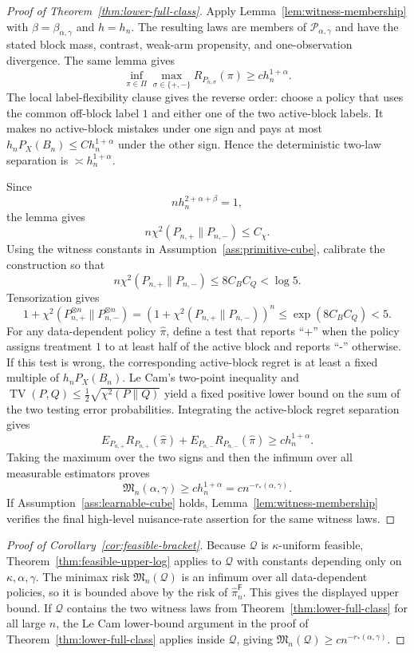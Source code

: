 \documentclass[11pt]{article}
\theoremstyle{definition}
\theoremstyle{plain}
\theoremstyle{remark}
\begin{document}
\begin{proof}[Proof of Theorem~\ref{thm:lower-full-class}]
Apply Lemma~\ref{lem:witness-membership} with
\(\beta=\beta_{\alpha,\gamma}\) and \(h=h_n\).  The resulting laws are
members of \(\mathcal P_{\alpha,\gamma}\) and have the stated block mass,
contrast, weak-arm propensity, and one-observation divergence.  The same
lemma gives
\[
\inf_{\pi\in\Pi}\max_{\sigma\in\{+,-\}}R_{P_{n,\sigma}}(\pi)
\ge c h_n^{1+\alpha}.
\]
The local label-flexibility clause gives the reverse order: choose a policy
that uses the common off-block label \(1\) and either one of the two
active-block labels.  It makes no active-block mistakes under one sign and
pays at most \(h_nP_X(B_n)\le C h_n^{1+\alpha}\) under the other sign.  Hence
the deterministic two-law separation is \(\asymp h_n^{1+\alpha}\).

Since
\[
n h_n^{2+\alpha+\beta}=1,
\]
the lemma gives
\[
n\chi^2(P_{n,+}\|P_{n,-})\le C_\chi.
\]
Using the witness constants in Assumption~\ref{ass:primitive-cube}, calibrate
the construction so that
\[
n\chi^2(P_{n,+}\|P_{n,-})\le 8C_BC_Q<\log 5.
\]
Tensorization gives
\[
1+\chi^2(P_{n,+}^{\otimes n}\|P_{n,-}^{\otimes n})
=(1+\chi^2(P_{n,+}\|P_{n,-}))^n
\le \exp(8C_BC_Q)<5.
\]
For any data-dependent policy \(\widehat\pi\), define a test that reports
``+'' when the policy assigns treatment \(1\) to at least half of the active
block and reports ``-'' otherwise.  If this test is wrong, the corresponding
active-block regret is at least a fixed multiple of \(h_nP_X(B_n)\).  Le
Cam's two-point inequality and
\(\operatorname{TV}(P,Q)\le\tfrac12\sqrt{\chi^2(P\|Q)}\) yield a fixed
positive lower bound on the sum of the two testing error probabilities.
Integrating the active-block regret separation gives
\[
E_{P_{n,+}}R_{P_{n,+}}(\widehat\pi)
+E_{P_{n,-}}R_{P_{n,-}}(\widehat\pi)
\ge c h_n^{1+\alpha}.
\]
Taking the maximum over the two signs and then the infimum over all
measurable estimators proves
\[
\mathfrak M_n(\alpha,\gamma)\ge c h_n^{1+\alpha}
=c n^{-r_*(\alpha,\gamma)}.
\]
If Assumption~\ref{ass:learnable-cube} holds,
Lemma~\ref{lem:witness-membership} verifies the final high-level
nuisance-rate assertion for the same witness laws.
\end{proof}

\begin{proof}[Proof of Corollary~\ref{cor:feasible-bracket}]
Because \(\mathcal Q\) is \(\kappa\)-uniform feasible,
Theorem~\ref{thm:feasible-upper-log} applies to \(\mathcal Q\) with constants
depending only on \(\kappa,\alpha,\gamma\).  The minimax risk
\(\mathfrak M_n(\mathcal Q)\) is an infimum over all data-dependent policies,
so it is bounded above by the risk of \(\widehat\pi_n^{\mathsf F}\).  This
gives the displayed upper bound.  If \(\mathcal Q\) contains the two witness
laws from Theorem~\ref{thm:lower-full-class} for all large \(n\), the Le Cam
lower-bound argument in the proof of Theorem~\ref{thm:lower-full-class}
applies inside \(\mathcal Q\), giving
\(\mathfrak M_n(\mathcal Q)\ge c n^{-r_*(\alpha,\gamma)}\).
\end{proof}
\end{document}
